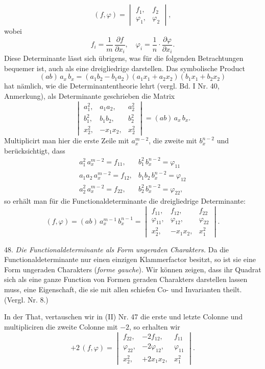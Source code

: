 \documentclass[11pt]{article}
\providecommand{\weberpage}[1]{}
\providecommand{\weq}[2]{\begin{equation}\tag{#1}#2\end{equation}}
\begin{document}
\weberpage{51}
\weq{I}{(f, \varphi) = \begin{vmatrix} f_1, & f_2 \\ \varphi_1, & \varphi_2 \end{vmatrix},}
wobei
\[
f_i = \frac{1}{m}\,\frac{\partial f}{\partial x_i}, \quad \varphi_i = \frac{1}{n}\cdot\frac{\partial \varphi}{\partial x_i}.
\]
Diese Determinante lässt sich übrigens, was für die folgenden Betrachtungen bequemer ist, auch als eine dreigliedrige darstellen. Das symbolische Product
\[
(ab)\,a_x\,b_x = (a_1b_2 - b_1a_2)(a_1x_1 + a_2x_2)(b_1x_1 + b_2x_2)
\]
hat nämlich, wie die Determinantentheorie lehrt (vergl. Bd. I Nr. 40, Anmerkung), als Determinante geschrieben die Matrix
\[
\begin{vmatrix} a_1^2, & a_1a_2, & a_2^2 \\ b_1^2, & b_1b_2, & b_2^2 \\ x_2^2, & -x_1x_2, & x_2^2 \end{vmatrix} = (ab)\,a_x\,b_x.
\]
Multiplicirt man hier die erste Zeile mit $a_x^{m-2}$, die zweite mit $b_x^{n-2}$ und berücksichtigt, dass
\[
\begin{array}{ll}
a_1^2\,a_x^{m-2} = f_{11}, & b_1^2\,b_x^{n-2} = \varphi_{11} \\
a_1a_2\,a_x^{m-2} = f_{12}, & b_1b_2\,b_x^{n-2} = \varphi_{12} \\
a_2^2\,a_x^{m-2} = f_{22}, & b_2^2\,b_x^{n-2} = \varphi_{22},
\end{array}
\]
so erhält man für die Functionaldeterminante die dreigliedrige Determinante:
\weq{II}{(f, \varphi) = (ab)\,a_x^{m-1}\,b_x^{n-1} = \begin{vmatrix} f_{11}, & f_{12}, & f_{22} \\ \varphi_{11}, & \varphi_{12}, & \varphi_{22} \\ x_2^2, & -x_1x_2, & x_1^2 \end{vmatrix}.}

48. \textit{Die Functionaldeterminante als Form ungeraden Charakters.} Da die Functionaldeterminante nur einen einzigen Klammerfactor besitzt, so ist sie eine Form ungeraden Charakters (\textit{forme gauche}). Wir können zeigen, dass ihr Quadrat sich als eine ganze Function von Formen geraden Charakters darstellen lassen muss, eine Eigenschaft, die sie mit allen schiefen Co- und Invarianten theilt. (Vergl. Nr. 8.)

In der That, vertauschen wir in (II) Nr. 47 die erste und letzte Colonne und multipliciren die zweite Colonne mit $-2$, so erhalten wir
\[
+2\,(f, \varphi) = \begin{vmatrix} f_{22}, & -2f_{12}, & f_{11} \\ \varphi_{22}, & -2\varphi_{12}, & \varphi_{11} \\ x_2^2, & +2x_1x_2, & x_1^2 \end{vmatrix}.
\]
\end{document}
